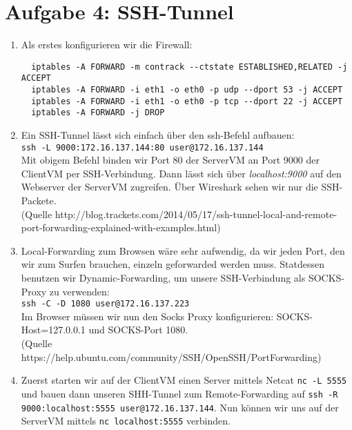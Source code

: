 \documentclass{scrartcl}
\begin{document}
	\section*{Aufgabe 4: SSH-Tunnel}
	\label{sec:SSH-Tunnel}
	\begin{enumerate}[\bfseries 1.]
		\item
		      Als erstes konfigurieren wir die Firewall:
		      \begin{lstlisting}
  iptables -A FORWARD -m contrack --ctstate ESTABLISHED,RELATED -j ACCEPT
  iptables -A FORWARD -i eth1 -o eth0 -p udp --dport 53 -j ACCEPT
  iptables -A FORWARD -i eth1 -o eth0 -p tcp --dport 22 -j ACCEPT
  iptables -A FORWARD -j DROP
		\end{lstlisting}

		\item
		      Ein SSH-Tunnel lässt sich einfach über den ssh-Befehl aufbauen: \\
		      \texttt{ssh -L 9000:172.16.137.144:80 user@172.16.137.144}\\
		      Mit obigem Befehl binden wir Port 80 der ServerVM an Port 9000 der ClientVM
		      per SSH-Verbindung. Dann lässt sich über \textit{localhost:9000} auf den
		      Webserver der ServerVM zugreifen. Über Wireshark sehen wir nur die
		      SSH-Packete.\\
		      (Quelle http://blog.trackets.com/2014/05/17/ssh-tunnel-local-and-remote-port-forwarding-explained-with-examples.html)

		\item
		      Local-Forwarding zum Browsen wäre sehr aufwendig, da wir jeden Port, den
		      wir zum Surfen brauchen, einzeln geforwarded werden muss.
		      Statdessen benutzen wir Dynamic-Forwarding, um unsere SSH-Verbindung als
		      SOCKS-Proxy zu verwenden: \\
		      \texttt{ssh -C -D 1080 user@172.16.137.223}\\
		      Im Browser müssen wir nun den Socks Proxy konfigurieren:
		      SOCKS-Host=127.0.0.1 und SOCKS-Port 1080.\\
		      (Quelle https://help.ubuntu.com/community/SSH/OpenSSH/PortForwarding)

    \item
		      Zuerst starten wir auf der ClientVM einen Server mittels Netcat
		      \texttt{nc -L 5555} und bauen dann unseren SHH-Tunnel zum Remote-Forwarding
		      auf \texttt{ssh -R 9000:localhost:5555 user@172.16.137.144}. Nun können wir uns
		      auf der ServerVM mittels \texttt{nc localhost:5555} verbinden.
	\end{enumerate}
\end{document}
